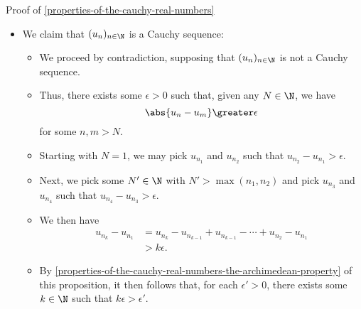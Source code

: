 \begin{Proof}{Proof of \cref{properties-of-the-cauchy-real-numbers}}
\begin{itemize}
\begin{itemize}
\begin{itemize}
                            \[
                                u_{n+1}%
                                \defeq%
                                (\ell_{n}+u_{n})/2,%
                            \]%
                            so we have
                            \begin{align*}
                                u_{n+1} &\defeq \frac{\ell_{n}+u_{n}}{2}\\
                                        &\leq   \frac{u_{n}+u_{n}}{2}\\
                                        &=      u_{n}.
                            \end{align*}
                        \item If $(\ell_{n}+u_{n})/2$ is not an upper bound of $S$, we have $u_{n+1}\defeq u_{n}$, so indeed $u_{n+1}\leq u_{n}$.
                    \end{itemize}
            \end{itemize}
        \item We claim that $(u_{n})_{n\in\N}$ is a Cauchy sequence:
            \begin{itemize}
                \item We proceed by contradiction, supposing that $(u_{n})_{n\in\N}$ is not a Cauchy sequence.
                \item Thus, there exists some $\epsilon\greater0$ such that, given any $N\in\N$, we have
                    \[
                        \abs{u_{n}-u_{m}}%
                        \greater%
                        \epsilon%
                    \]%
                    for some $n,m\greater N$.
                \item Starting with $N=1$, we may pick $u_{n_{1}}$ and $u_{n_{2}}$ such that $u_{n_{2}}-u_{n_{1}}\greater\epsilon$.
                \item Next, we pick some $N'\in\N$ with $N'\greater\max(n_{1},n_{2})$ and pick $u_{n_{3}}$ and $u_{n_{4}}$ such that $u_{n_{4}}-u_{n_{3}}\greater\epsilon$.
                \item We then have
                    \begin{align*}
                        u_{n_{k}}-u_{n_{1}} &=        u_{n_{k}}-u_{n_{k-1}}+u_{n_{k-1}}-\cdots+u_{n_{2}}-u_{n_{1}}\\
                                            &\greater k\epsilon.%
                    \end{align*}
                \item By \cref{properties-of-the-cauchy-real-numbers-the-archimedean-property} of this proposition, it then follows that, for each $\epsilon'\greater0$, there exists some $k\in\N$ such that $k\epsilon\greater\epsilon'$.

\end{itemize}
\end{itemize}
\end{Proof}
